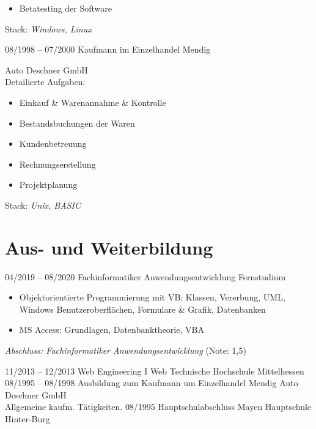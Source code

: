 \documentclass[a4paper]{friggeri-cv} %
\begin{document}
\begin{entrylist}
{\begin{itemize}
        \item Betatesting der Software        
    \end{itemize}
		Stack: \textit{Windows, Linux}
}
\entry
{08/1998 -- 07/2000}
{Kaufmann im Einzelhandel}
{Mendig}
{Auto Deschner GmbH\\
    Detailierte Aufgaben:
    \begin{itemize}
        \item Einkauf \& Warenannahme \& Kontrolle
        \item Bestandsbuchungen der Waren
        \item Kundenbetreuung
        \item Rechnungserstellung
        \item Projektplanung
    \end{itemize}
		Stack: \textit{Unix, BASIC}
}
\end{entrylist}


\section{Aus- und Weiterbildung}

\begin{entrylist}
\entry
{04/2019 -- 08/2020}
{Fachinformatiker Anwendungsentwicklung}
{Fernstudium}
{\begin{itemize}
        \item Objektorientierte Programmierung mit VB: Klassen, Vererbung, UML, Windows Benutzeroberflächen, Formulare \& Grafik, Datenbanken
        \item MS Access: Grundlagen, Datenbanktheorie, VBA
    \end{itemize}
{\emph{Abschluss: Fachinformatiker Anwendungsentwicklung} (Note: 1,5)}
}
\newline
\entry
{11/2013 -- 12/2013}
{Web Engineering I}
{Web}
{Technische Hochschule Mittelhessen}
\entry
{08/1995 -- 08/1998}
{Ausbildung zum Kaufmann um Einzelhandel}
{Mendig}
{Auto Deschner GmbH\\
Allgemeine kaufm. Tätigkeiten.
}
\entry
{08/1995}
{Hauptschulabschluss}
{Mayen}
{Hauptschule Hinter-Burg}
\end{entrylist}
\newpage
\end{document}
